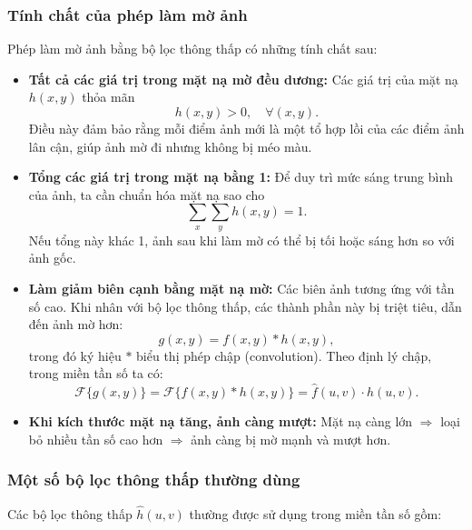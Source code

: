 \documentclass[12pt,a4paper]{report}
\numberwithin{equation}{section}
\theoremstyle{definition} %
\begin{document}
\subsubsection*{Tính chất của phép làm mờ ảnh}
Phép làm mờ ảnh bằng bộ lọc thông thấp có những tính chất sau:

\begin{itemize}
	\item \textbf{Tất cả các giá trị trong mặt nạ mờ đều dương:}  
	Các giá trị của mặt nạ $h(x,y)$ thỏa mãn 
	\[
	h(x,y) > 0, \quad \forall (x,y).
	\]
	Điều này đảm bảo rằng mỗi điểm ảnh mới là một tổ hợp lồi của các điểm ảnh lân cận, giúp ảnh mờ đi nhưng không bị méo màu.

	\item \textbf{Tổng các giá trị trong mặt nạ bằng 1:}  
	Để duy trì mức sáng trung bình của ảnh, ta cần chuẩn hóa mặt nạ sao cho
	\[
	\sum_{x}\sum_{y} h(x,y) = 1.
	\]
	Nếu tổng này khác 1, ảnh sau khi làm mờ có thể bị tối hoặc sáng hơn so với ảnh gốc.

	\item \textbf{Làm giảm biên cạnh bằng mặt nạ mờ:}  
	Các biên ảnh tương ứng với tần số cao. Khi nhân với bộ lọc thông thấp, các thành phần này bị triệt tiêu, dẫn đến ảnh mờ hơn:
	\[
	g(x,y) = f(x,y) * h(x,y),
	\]
	trong đó ký hiệu $*$ biểu thị phép chập (convolution). Theo định lý chập, trong miền tần số ta có:
	\[
	\mathcal{F}\{g(x,y)\} = \mathcal{F}\{f(x,y)*h(x,y)\} = \hat{f}(u,v)\cdot\hat{h}(u,v).
	\]

	\item \textbf{Khi kích thước mặt nạ tăng, ảnh càng mượt:}  
	Mặt nạ càng lớn $\Rightarrow$ loại bỏ nhiều tần số cao hơn $\Rightarrow$ ảnh càng bị mờ mạnh và mượt hơn.
\end{itemize}

\subsubsection*{Một số bộ lọc thông thấp thường dùng}
Các bộ lọc thông thấp $\hat{h}(u,v)$ thường được sử dụng trong miền tần số gồm:
\end{document}

